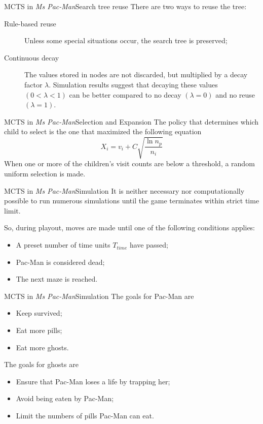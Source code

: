 \documentclass{beamer}
\begin{document}
  \begin{frame}{MCTS in \textit{Ms Pac-Man}}{Search tree reuse}
    There are two ways to reuse the tree:
    \begin{description}
      \item[Rule-based reuse] Unless some special situations occur, the search tree is preserved;
      \item[Continuous decay] The values stored in nodes are not discarded, but multiplied by a decay factor $\lambda$. Simulation results suggest that decaying these values $(0 < \lambda < 1)$ can be better compared to no decay $(\lambda = 0)$ and no reuse $(\lambda = 1)$.
    \end{description}
  \end{frame}

  \begin{frame}{MCTS in \textit{Ms Pac-Man}}{Selection and Expansion}
    The policy that determines which child to select is the one that maximized the following equation
    $$ X_i = v_i + C\sqrt{\frac{\ln n_p}{n_i}} $$
    When one or more of the children's visit counts are below a threshold, a random uniform selection is made.
  \end{frame}

  \begin{frame}{MCTS in \textit{Ms Pac-Man}}{Simulation}
    It is neither necessary nor computationally possible to run numerous simulations until the game terminates within strict time limit.

    So, during playout, moves are made until one of the following conditions applies:
    \begin{itemize}
      \item A preset number of time units $T_{time}$ have passed;
      \item Pac-Man is considered dead;
      \item The next maze is reached.
    \end{itemize}
  \end{frame}

  \begin{frame}{MCTS in \textit{Ms Pac-Man}}{Simulation}
    The goals for Pac-Man are
    \begin{itemize}
      \item Keep survived;
      \item Eat more pills;
      \item Eat more ghosts.
    \end{itemize}
    The goals for ghosts are
    \begin{itemize}
      \item Ensure that Pac-Man loses a life by trapping her;
      \item Avoid being eaten by Pac-Man;
      \item Limit the numbers of pills Pac-Man can eat.
    \end{itemize}
  \end{frame}
\end{document}
